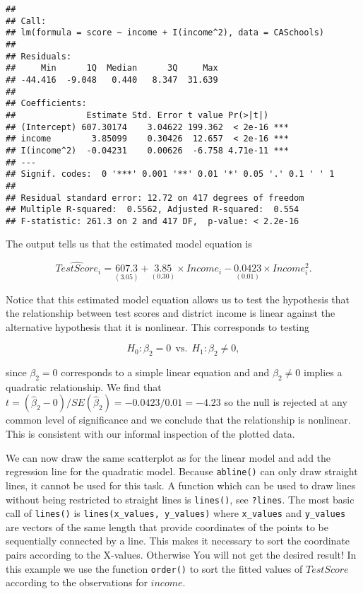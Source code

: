 \documentclass[]{book}
\theoremstyle{definition}
\theoremstyle{definition}
\theoremstyle{definition}
\theoremstyle{remark}
\begin{document}
\begin{verbatim}
## 
## Call:
## lm(formula = score ~ income + I(income^2), data = CASchools)
## 
## Residuals:
##     Min      1Q  Median      3Q     Max 
## -44.416  -9.048   0.440   8.347  31.639 
## 
## Coefficients:
##              Estimate Std. Error t value Pr(>|t|)    
## (Intercept) 607.30174    3.04622 199.362  < 2e-16 ***
## income        3.85099    0.30426  12.657  < 2e-16 ***
## I(income^2)  -0.04231    0.00626  -6.758 4.71e-11 ***
## ---
## Signif. codes:  0 '***' 0.001 '**' 0.01 '*' 0.05 '.' 0.1 ' ' 1
## 
## Residual standard error: 12.72 on 417 degrees of freedom
## Multiple R-squared:  0.5562, Adjusted R-squared:  0.554 
## F-statistic: 261.3 on 2 and 417 DF,  p-value: < 2.2e-16
\end{verbatim}

The output tells us that the estimated model equation is

\[ \widehat{TestScore}_i = \underset{(3.05)}{607.3} + \underset{(0.30)}{3.85} \times Income_i - \underset{(0.01)}{0.0423} \times Income_i^2. \]

Notice that this estimated model equation allows us to test the
hypothesis that the relationship between test scores and district income
is linear against the alternative hypothesis that it is nonlinear. This
corresponds to testing

\[ H_0: \beta_2 = 0 \ \ \text{vs.} \ \  H_1: \beta_2\neq0,\]

since \(\beta_2=0\) corresponds to a simple linear equation and and
\(\beta_2\neq0\) implies a quadratic relationship. We find that
\(t=(\hat\beta_2 - 0)/SE(\hat\beta_2) = -0.0423/0.01 = -4.23\) so the
null is rejected at any common level of significance and we conclude
that the relationship is nonlinear. This is consistent with our informal
inspection of the plotted data.

We can now draw the same scatterplot as for the linear model and add the
regression line for the quadratic model. Because \texttt{abline()} can
only draw straight lines, it cannot be used for this task. A function
which can be used to draw lines without being restricted to straight
lines is \texttt{lines()}, see \texttt{?lines}. The most basic call of
\texttt{lines()} is \texttt{lines(x\_values,\ y\_values)} where
\texttt{x\_values} and \texttt{y\_values} are vectors of the same length
that provide coordinates of the points to be sequentially connected by a
line. This makes it necessary to sort the coordinate pairs according to
the X-values. Otherwise You will not get the desired result! In this
example we use the function \texttt{order()} to sort the fitted values
of \(TestScore\) according to the observations for \(income\).
\end{document}
